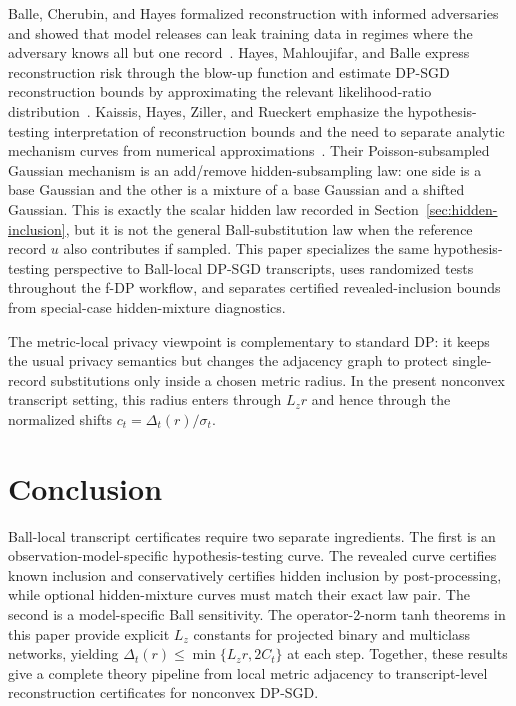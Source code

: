 \documentclass[conference,compsoc]{IEEEtran}
\begin{document}
Balle, Cherubin, and Hayes formalized reconstruction with informed adversaries
and showed that model releases can leak training data in regimes where the
adversary knows all but one record~\cite{balle2022}.  Hayes, Mahloujifar, and
Balle express reconstruction risk through the blow-up function and estimate
DP-SGD reconstruction bounds by approximating the relevant likelihood-ratio
distribution~\cite{hayes2023}.  Kaissis, Hayes, Ziller, and Rueckert emphasize
the hypothesis-testing interpretation of reconstruction bounds and the need to
separate analytic mechanism curves from numerical approximations~\cite{kaissis2023}.
Their Poisson-subsampled Gaussian mechanism is an add/remove hidden-subsampling
law: one side is a base Gaussian and the other is a mixture of a base Gaussian
and a shifted Gaussian.  This is exactly the scalar hidden law recorded in
Section~\ref{sec:hidden-inclusion}, but it is not the general Ball-substitution
law when the reference record $u$ also contributes if sampled.  This paper
specializes the same hypothesis-testing perspective to Ball-local DP-SGD
transcripts, uses randomized tests throughout the f-DP workflow, and separates
certified revealed-inclusion bounds from special-case hidden-mixture diagnostics.

The metric-local privacy viewpoint is complementary to standard DP: it keeps
the usual privacy semantics but changes the adjacency graph to protect
single-record substitutions only inside a chosen metric radius.  In the present
nonconvex transcript setting, this radius enters through $L_zr$ and hence
through the normalized shifts $c_t=\Delta_t(r)/\sigma_t$.

\section{Conclusion}
\label{sec:conclusion}

Ball-local transcript certificates require two separate ingredients.  The first
is an observation-model-specific hypothesis-testing curve.  The revealed curve
certifies known inclusion and conservatively certifies hidden inclusion by
post-processing, while optional hidden-mixture curves must match their exact law
pair.  The second is a model-specific Ball sensitivity.  The operator-2-norm
tanh theorems in this paper provide explicit $L_z$ constants
for projected binary and multiclass networks, yielding
$\Delta_t(r)\le\min\{L_zr,2C_t\}$ at each step.  Together, these results give a
complete theory pipeline from local metric adjacency to transcript-level
reconstruction certificates for nonconvex DP-SGD.
\end{document}
